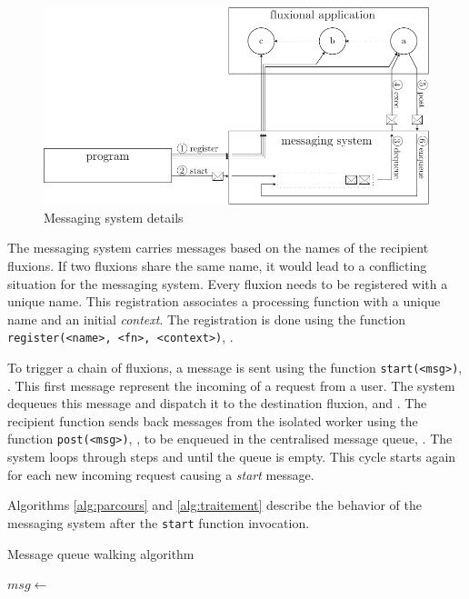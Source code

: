 \begin{figure}[h!]
  \includegraphics[width=\linewidth]{ressources/schema-message.pdf}
  \caption{Messaging system details}
  \label{fig:MesSys}
\end{figure}

The messaging system carries messages based on the names of the recipient fluxions.
If two fluxions share the same name, it would lead to a conflicting situation for the messaging system.
Every fluxion needs to be registered with a unique name.
This registration associates a processing function with a unique name and an initial \textit{context}.
The registration is done using the function \texttt{register(<name>, <fn>, <context>)}, .

To trigger a chain of fluxions, a message is sent using the function \texttt{start(<msg>)}, .
This first message represent the incoming of a request from a user.
The system dequeues this message and dispatch it to the destination fluxion,  and .
The recipient function sends back messages from the isolated worker using the function \texttt{post(<msg>)}, , to be enqueued in the centralised message queue, .
The system loops through steps  and  until the queue is empty.
This cycle starts again for each new incoming request causing a \textit{start} message.

Algorithms \ref{alg:parcours} and \ref{alg:traitement} describe the behavior of the messaging system after the \texttt{start} function invocation.

\begin{algorithm}
\caption{Message queue walking algorithm}
\label{alg:parcours}
\begin{algorithmic}
\State $msg \gets$  
\State {}
\EndWhile
\EndFunction
\end{algorithmic}
\end{algorithm}

